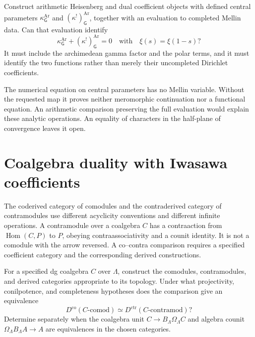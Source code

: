 \begin{question}
\label{v4-arith:thm:G-row-complementarity}
Construct arithmetic Heisenberg and dual coefficient objects with
defined central parameters \(\kappa^{\mathrm{Ar}}_{\mathsf G}\)
and \((\kappa^!)^{\mathrm{Ar}}_{\mathsf G}\), together with an
evaluation to completed Mellin data. Can that evaluation identify
\[
 \kappa^{\mathrm{Ar}}_{\mathsf G}
       +(\kappa^!)^{\mathrm{Ar}}_{\mathsf G}=0
 \quad\text{with}\quad \xi(s)=\xi(1-s)?
\]
It must include the archimedean gamma factor and the polar terms,
and it must identify the two functions rather than merely their
uncompleted Dirichlet coefficients.
\end{question}

The numerical equation on central parameters has no Mellin variable.
Without the requested map it proves neither meromorphic continuation
nor a functional equation. An arithmetic comparison preserving the
full evaluation would explain these analytic operations. An equality
of characters in the half-plane of convergence leaves it open.

\section{Coalgebra duality with Iwasawa coefficients}
\label{v4-arith:bar:positselski-arith}

The coderived category of comodules and the contraderived category
of contramodules use different acyclicity conventions and different
infinite operations. A contramodule over a coalgebra \(C\) has a
contraaction from \(\operatorname{Hom}(C,P)\) to \(P\), obeying
contraassociativity and a counit identity. It is not a comodule with
the arrow reversed. A co--contra comparison requires a specified
coefficient category and the corresponding derived constructions.

\begin{question}
\label{v4-arith:thm:arithmetic-positselski-preview}
For a specified dg coalgebra \(C\) over \(\Lambda\), construct the
comodules, contramodules, and derived categories appropriate to its
topology. Under what projectivity, conilpotence, and completeness
hypotheses does the comparison give an equivalence
\[
 D^{\mathrm{co}}(C\text{-comod})
 \simeq D^{\mathrm{ctr}}(C\text{-contramod})?
\]
Determine separately when the coalgebra unit
\(C\to B_\Lambda\Omega_\Lambda C\) and algebra counit
\(\Omega_\Lambda B_\Lambda A\to A\) are equivalences in the chosen
categories.
\end{question}

